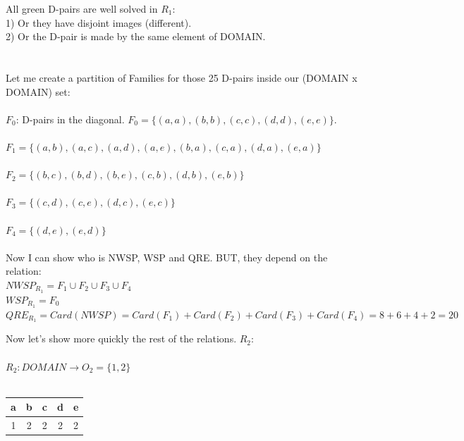 		\noindent
		All green D-pairs are well solved in $R_{1}$:\\
		1) Or they have disjoint images (different).\\
		2) Or the D-pair is made by the same element of DOMAIN.\\
		\\\\
		
		\noindent
		Let me create a partition of Families for those 25 D-pairs inside our (DOMAIN x DOMAIN) set:\\\\
		$F_{0}$: D-pairs in the diagonal. $F_{0} = \{(a,a), (b,b), (c,c), (d,d), (e,e)\}$.\\\\
		$F_{1} = \{(a,b), (a,c), (a,d), (a,e), (b,a),(c,a), (d,a),(e,a)\}$\\\\
		$F_{2} = \{(b,c),(b,d),(b,e),(c,b),(d,b),(e,b)\}$\\\\
		$F_{3} = \{(c,d),(c,e),(d,c),(e,c)\}$\\\\
		$F_{4} = \{(d,e),(e,d)\}$
		\\\\
		
		\noindent
		Now I can show who is NWSP, WSP and QRE. BUT, they depend on the relation:\\
		$NWSP_{R_{1}} = F_{1} \cup F_{2} \cup F_{3} \cup F_{4}$\\
		$WSP_{R_{1}} = F_{0}$\\
		$QRE_{R_{1}} = Card(NWSP) = Card(F_{1}) + Card(F_{2}) + Card(F_{3}) +  Card(F_{4})= 8+6+4+2= 20 $
		
		
		\newpage
		
		\noindent
		Now let's show more quickly the rest of the relations. $R_{2}$:\\\\
		$R_{2}: DOMAIN \rightarrow O_{2}=\{1,2\}$\\\\
		\begin{table}[h!]
			\begin{center}
				\begin{tabular}{|c|c|c|c|c|}
					\hline
					a & b & c & d & e \\
					\hline
					1 & 2 & 2 & 2 & 2 \\
					\hline
				\end{tabular}
			\end{center}
		\end{table}
		
